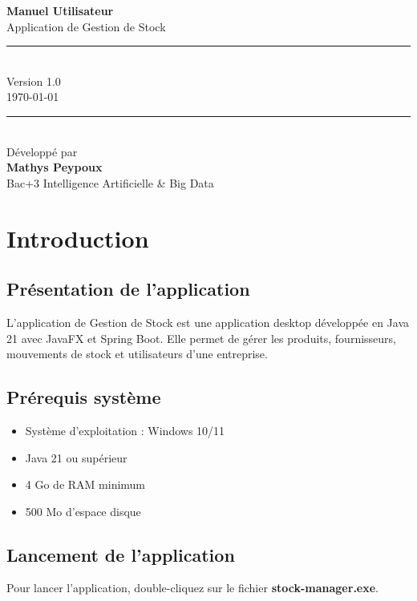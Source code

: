 \documentclass[12pt, a4paper]{article}
\begin{document}
	
	\begin{titlepage}
		\centering
		\vspace*{2cm}
		{\Huge\bfseries\color{dark} Manuel Utilisateur\\[0.5cm]}
		{\Large\color{primary} Application de Gestion de Stock\\[2cm]}
		\rule{\linewidth}{0.5mm}\\[0.5cm]
		{\large Version 1.0\\[0.3cm]}
		{\large \today\\[0.5cm]}
		\rule{\linewidth}{0.5mm}\\[2cm]
		{\large Développé par \\[0.3cm]}
		{\Large\bfseries Mathys Peypoux\\[1cm]}
		\vfill
		{\large Bac+3 Intelligence Artificielle \& Big Data}
	\end{titlepage}
	
	\newpage
	\tableofcontents
	\newpage
	
	\section{Introduction}
	\subsection{Présentation de l'application}
	L'application de Gestion de Stock est une application desktop développée en Java 21 avec JavaFX et Spring Boot. Elle permet de gérer les produits, fournisseurs, mouvements de stock et utilisateurs d'une entreprise.
	
	\subsection{Prérequis système}
	\begin{itemize}
		\item Système d'exploitation : Windows 10/11
		\item Java 21 ou supérieur
		\item 4 Go de RAM minimum
		\item 500 Mo d'espace disque
	\end{itemize}
		
	\subsection{Lancement de l'application}
	Pour lancer l'application, double-cliquez sur le fichier \textbf{stock-manager.exe}.
	
\end{document}
